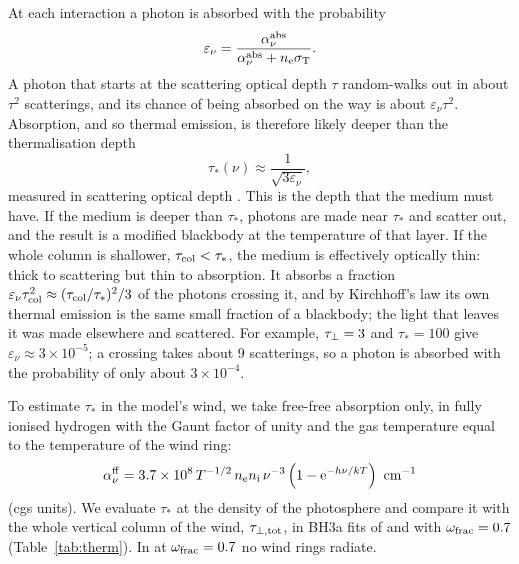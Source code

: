 At each interaction a photon is absorbed with the probability
\begin{equation}
\varepsilon_\nu = \frac{\alpha_\nu^{\rm abs}}{\alpha_\nu^{\rm abs} + n_{\rm e}\sigma_{\rm T}} .
\label{eq:eps_abs}
\end{equation}
A photon that starts at the scattering optical depth $\tau$ random-walks out in about $\tau^2$ scatterings, and its chance of being absorbed on the way is about $\varepsilon_\nu\tau^2$.
Absorption, and so thermal emission, is therefore likely deeper than the thermalisation depth
\begin{equation}
\tau_*(\nu) \approx \frac{1}{\sqrt{3\varepsilon_\nu}} ,
\label{eq:tau_therm}
\end{equation}
measured in scattering optical depth \citep{ZeldovichShakura1969, Shakura1973, RybickiLightman1979}.
This is the depth that the medium must have.
If the medium is deeper than $\tau_*$, photons are made near $\tau_*$ and scatter out, and the result is a modified blackbody at the temperature of that layer.
If the whole column is shallower, $\tau_{\rm col} < \tau_*$, the medium is effectively optically thin: thick to scattering but thin to absorption.
It absorbs a fraction $\varepsilon_\nu\tau_{\rm col}^2 \approx (\tau_{\rm col}/\tau_*)^2/3$ of the photons crossing it, and by Kirchhoff's law its own thermal emission is the same small fraction of a blackbody; the light that leaves it was made elsewhere and scattered.
For example, $\tau_\perp = 3$ and $\tau_* = 100$ give $\varepsilon_\nu \approx 3\times10^{-5}$; a crossing takes about 9 scatterings, so a photon is absorbed with the probability of only about $3\times10^{-4}$.

To estimate $\tau_*$ in the model's wind, we take free-free absorption only, in fully ionised hydrogen with the Gaunt factor of unity and the gas temperature equal to the temperature of the wind ring:
\begin{equation}
\alpha_\nu^{\rm ff} = 3.7\times10^{8}\,T^{-1/2}\,n_{\rm e}n_{\rm i}\,\nu^{-3}\left(1 - {\rm e}^{-h\nu/kT}\right)\ {\rm cm^{-1}}
\label{eq:alpha_ff}
\end{equation}
(cgs units).
We evaluate $\tau_*$ at the density of the photosphere and compare it with the whole vertical column of the wind, $\tau_{\perp,{\rm tot}}$, in BH3a fits of \srcHoIX and \srcNGCfiftyfour with $\omega_{\rm frac} = 0.7$ (Table~\ref{tab:therm}).
In \srcNGCthirteen at $\omega_{\rm frac} = 0.7$ no wind rings radiate.


